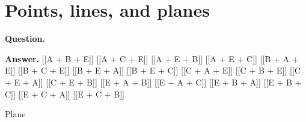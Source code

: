 \documentclass{article}
\begin{document}
\section*{Points, lines, and planes}
\textbf{Question.} 

\textbf{Answer.} [[A + B + E]]
                [[A + C + E]]
                [[A + E + B]]
                [[A + E + C]]
                [[B + A + E]]
                [[B + C + E]]
                [[B + E + A]]
                [[B + E + C]]
                [[C + A + E]]
                [[C + B + E]]
                [[C + E + A]]
                [[C + E + B]]
                [[E + A + B]]
                [[E + A + C]]
                [[E + B + A]]
                [[E + B + C]]
                [[E + C + A]]
                [[E + C + B]]

                
                    Plane
\end{document}
